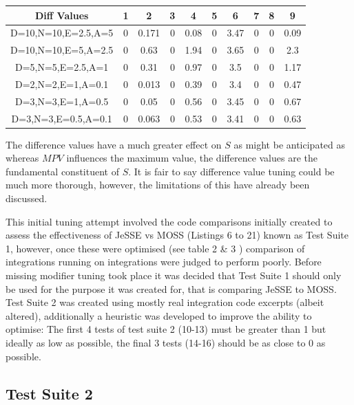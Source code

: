 \documentclass[jou,apacite]{apa6}
\begin{document}
\setlength{\tabcolsep}{2pt}
\renewcommand{\arraystretch}{1.5}

\begin{center}
 \begin{tabular}{||c c c c c c c c c c||} 
 \hline
 Diff Values & 1 & 2 & 3 & 4 & 5 & 6 & 7 & 8 & 9 \\ [-0.2ex] 
 \hline\hline
 D=10,N=10,E=2.5,A=5  & 0 & 0.171 & 0 & 0.08 & 0 & 3.47 & 0 & 0 & 0.09 \\ 
 \hline
 D=10,N=10,E=5,A=2.5  & 0 & 0.63 & 0 & 1.94 & 0 & 3.65 & 0 & 0 & 2.3  \\
 \hline
 D=5,N=5,E=2.5,A=1 & 0 & 0.31 & 0 & 0.97 & 0 & 3.5 & 0 & 0 & 1.17  \\
 \hline
  D=2,N=2,E=1,A=0.1  & 0 & 0.013 & 0 & 0.39 & 0 & 3.4 & 0 & 0 & 0.47  \\
  \hline
    D=3,N=3,E=1,A=0.5 & 0 & 0.05 & 0 & 0.56 & 0 & 3.45 & 0 & 0 & 0.67  \\
  \hline
   D=3,N=3,E=0.5,A=0.1  & 0 & 0.063 & 0 & 0.53 & 0 & 3.41 & 0 & 0 & 0.63 \\ 
  \hline
\end{tabular}
\end{center}

The difference values have a much greater effect on $S$ as might be anticipated as whereas $MPV$ influences the maximum value, the difference values are the fundamental constituent of $S$. It is fair to say difference value tuning could be much more thorough, however, the limitations of this have already been discussed.

This initial tuning attempt involved the code comparisons initially created to assess the effectiveness of JeSSE vs MOSS (Listings 6 to 21) known as Test Suite 1, however, once these were optimised (see table 2 \& 3 ) comparison of integrations running on integrations were judged to perform poorly. Before missing modifier tuning took place it was decided that Test Suite 1 should only be used for the purpose it was created for, that is comparing JeSSE to MOSS. Test Suite 2 was created using mostly real integration code excerpts (albeit  altered), additionally a heuristic was developed to improve the ability to optimise: The first 4 tests of test suite 2 (10-13) must be greater than 1 but ideally as low as possible, the final 3 tests (14-16) should be as close to 0 as possible. 

\subsection{Test Suite 2}
\end{document}

